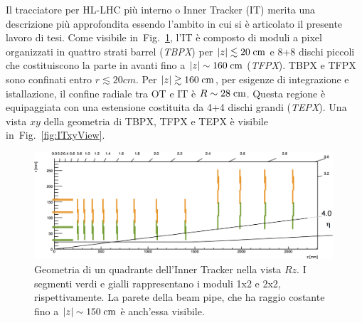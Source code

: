 Il tracciatore per HL-LHC pi\`u interno o Inner Tracker (IT) merita una descrizione pi\`u approfondita essendo l'ambito in cui si \`e articolato il presente lavoro di tesi. Come visibile in~Fig.~\ref{fig:ITRzView}, l'IT \`e composto di moduli a pixel organizzati in quattro strati barrel ({\em TBPX}) per $|z|\lesssim20\rm \; cm$ e 8+8 dischi piccoli che costituiscono la parte in avanti fino a $|z|\sim160\rm \; cm$ ({\em TFPX}). TBPX e TFPX sono confinati entro $r\lesssim20cm$. Per $|z|\gtrsim160\rm \; cm$, per esigenze di integrazione e istallazione, il confine radiale tra OT e IT \`e $R\sim28\rm \; cm$. Questa regione \`e equipaggiata con una estensione costituita da 4+4 dischi grandi ({\em TEPX}). Una vista $xy$ della geometria di TBPX, TFPX e TEPX \`e visibile in~Fig.~\ref{fig:ITxyView}. 
\begin{figure}
\centering
\includegraphics[width=0.99\textwidth]{Immagini/ITRzLayout.png}
\caption{Geometria di un quadrante dell'Inner Tracker nella vista $Rz$. I segmenti verdi e gialli rappresentano i moduli 1x2 e 2x2, rispettivamente. La parete della beam pipe, che ha raggio costante fino a $|z|\sim 150\rm \; cm$ \`e anch'essa visibile.}
\label{fig:ITRzView}
\end{figure}
%
